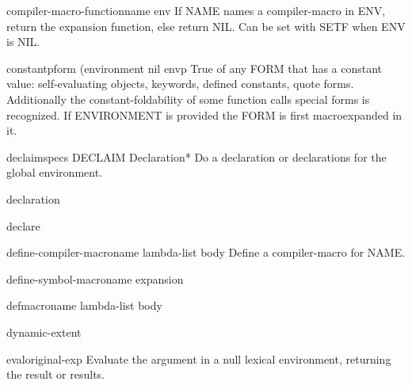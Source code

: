 \begin{accessor}{compiler-macro-function}{name \op env}{}
  If NAME names a compiler-macro in ENV, return the expansion function, else
return NIL. Can be set with SETF when ENV is NIL.
\end{accessor}

\begin{function}{constantp}{form \op (environment nil envp}{}
  True of any FORM that has a constant value: self-evaluating objects,
keywords, defined constants, quote forms. Additionally the
constant-foldability of some function calls special forms is recognized. If
ENVIRONMENT is provided the FORM is first macroexpanded in it.
\end{function}

\begin{macro}{declaim}{\rest specs}{}
  DECLAIM Declaration*
  Do a declaration or declarations for the global environment.
\end{macro}

\begin{declaration}{declaration}{}{}
  
\end{declaration}

\begin{symbol}{declare}{}{}
  
\end{symbol}

\begin{macro}{define-compiler-macro}{name lambda-list \body body}{}
  Define a compiler-macro for NAME.
\end{macro}

\begin{macro}{define-symbol-macro}{name expansion}{}
  
\end{macro}

\begin{macro}{defmacro}{name lambda-list \rest body}{}
  
\end{macro}

\begin{declaration}{dynamic-extent}{}{}
  
\end{declaration}

\begin{function}{eval}{original-exp}{}
  Evaluate the argument in a null lexical environment, returning the
   result or results.
\end{function}

